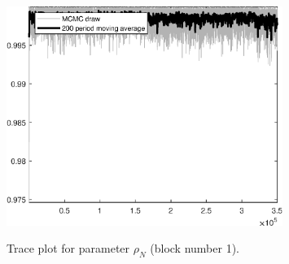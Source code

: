 \begin{figure}[H]
\centering
  \includegraphics[width=0.8\textwidth]{BRS_growth_id/graphs/TracePlot_rho_N_blck_1}\\
    \caption{Trace plot for parameter ${\rho_N}$ (block number 1).}
\end{figure}
